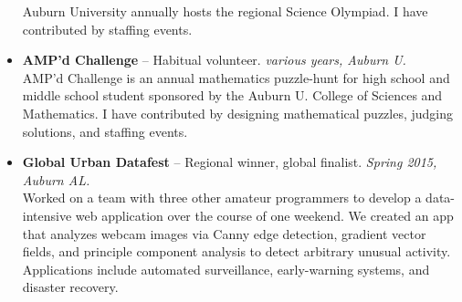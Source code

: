 \documentclass[11pt]{article}
\begin{document}
\begin{itemize}
        Auburn University annually hosts the regional Science Olympiad.
        I have contributed by staffing events.
    \item{}
      {\bf AMP'd Challenge} --
      {Habitual volunteer.}
      {\em various years, Auburn U.}\\
        AMP'd Challenge is an annual mathematics puzzle-hunt for high
        school and middle school student sponsored by the Auburn U.
        College of Sciences and Mathematics. I have contributed by
        designing mathematical puzzles, judging solutions, and staffing
        events.
    \item{}
      {\bf Global Urban Datafest} --
      {Regional winner, global finalist.}
      {\em Spring 2015, Auburn AL.}\\
        Worked on a team with three other amateur programmers to develop
        a data-intensive web application over the course of one weekend.
        We created an app that analyzes webcam images via Canny edge
        detection, gradient vector fields, and principle component
        analysis to detect arbitrary unusual activity. Applications
        include automated surveillance, early-warning systems, and
        disaster recovery.
  \end{itemize}

\label{page:last}
\end{document}
